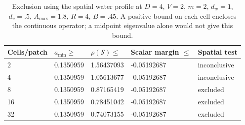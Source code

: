 \begin{table}[htbp]
\centering
\caption{Exclusion using the spatial water profile at $D=4$, $V=2$, $m=2$, $d_w=1$, $d_v=.5$, $A_{\max}=1.8$, $R=4$, $B=.45$. A positive bound on each cell encloses the continuous operator; a midpoint eigenvalue alone would not give this bound.}
\label{tab:weighted_water}
\begin{tabular}{lllll}
\toprule
Cells/patch & $a_{\min}\geq$ & $\rho(\mathcal S)\leq$ & Scalar margin $\leq$ & Spatial test \\
\midrule
2 & 0.1350959 & 1.56437093 & -0.05192687 & inconclusive \\
4 & 0.1350959 & 1.05613677 & -0.05192687 & inconclusive \\
8 & 0.1350959 & 0.87165419 & -0.05192687 & excluded \\
16 & 0.1350959 & 0.78451042 & -0.05192687 & excluded \\
32 & 0.1350959 & 0.74073155 & -0.05192687 & excluded \\
\bottomrule
\end{tabular}
\end{table}
